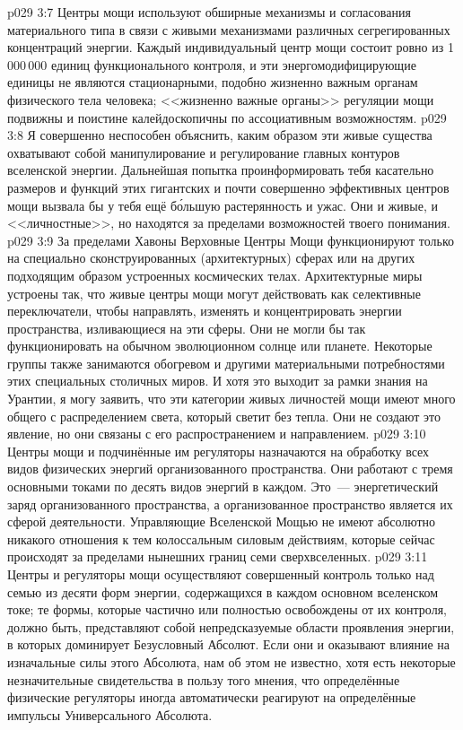 \vs p029 3:7 Центры мощи используют обширные механизмы и согласования материального типа в связи с живыми механизмами различных сегрегированных концентраций энергии. Каждый индивидуальный центр мощи состоит ровно из 1\,000\,000 единиц функционального контроля, и эти энергомодифицирующие единицы не являются стационарными, подобно жизненно важным органам физического тела человека; <<жизненно важные органы>> регуляции мощи подвижны и поистине калейдоскопичны по ассоциативным возможностям.
\vs p029 3:8 Я совершенно неспособен объяснить, каким образом эти живые существа охватывают собой манипулирование и регулирование главных контуров вселенской энергии. Дальнейшая попытка проинформировать тебя касательно размеров и функций этих гигантских и почти совершенно эффективных центров мощи вызвала бы у тебя ещё б\'ольшую растерянность и ужас. Они и живые, и <<личностные>>, но находятся за пределами возможностей твоего понимания.
\vs p029 3:9 \pc За пределами Хавоны Верховные Центры Мощи функционируют только на специально сконструированных (архитектурных) сферах или на других подходящим образом устроенных космических телах. Архитектурные миры устроены так, что живые центры мощи могут действовать как селективные переключатели, чтобы направлять, изменять и концентрировать энергии пространства, изливающиеся на эти сферы. Они не могли бы так функционировать на обычном эволюционном солнце или планете. Некоторые группы также занимаются обогревом и другими материальными потребностями этих специальных столичных миров. И хотя это выходит за рамки знания на Урантии, я могу заявить, что эти категории живых личностей мощи имеют много общего с распределением света, который светит без тепла. Они не создают это явление, но они связаны с его распространением и направлением.
\vs p029 3:10 \pc Центры мощи и подчинённые им регуляторы назначаются на обработку всех видов физических энергий организованного пространства. Они работают с тремя основными токами по десять видов энергий в каждом. Это~--- энергетический заряд организованного пространства, а организованное пространство является их сферой деятельности. Управляющие Вселенской Мощью не имеют абсолютно никакого отношения к тем колоссальным силовым действиям, которые сейчас происходят за пределами нынешних границ семи сверхвселенных.
\vs p029 3:11 Центры и регуляторы мощи осуществляют совершенный контроль только над семью из десяти форм энергии, содержащихся в каждом основном вселенском токе; те формы, которые частично или полностью освобождены от их контроля, должно быть, представляют собой непредсказуемые области проявления энергии, в которых доминирует Безусловный Абсолют. Если они и оказывают влияние на изначальные силы этого Абсолюта, нам об этом не известно, хотя есть некоторые незначительные свидетельства в пользу того мнения, что определённые физические регуляторы иногда автоматически реагируют на определённые импульсы Универсального Абсолюта.
